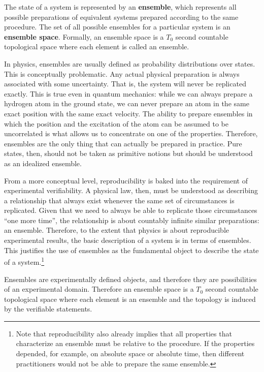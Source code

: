 \begin{mathSection}
	\begin{axiom} 
		The state of a system is represented by an \textbf{ensemble}, which represents all possible preparations of equivalent systems prepared according to the same procedure. The set of all possible ensembles for a particular system is an \textbf{ensemble space}. Formally, an ensemble space is a $T_0$ second countable topological space where each element is called an ensemble.
	\end{axiom}
	
	\begin{justification}
		In physics, ensembles are usually defined as probability distributions over states. This is conceptually problematic. Any actual physical preparation is always associated with some uncertainty. That is, the system will never be replicated exactly. This is true even in quantum mechanics: while we can always prepare a hydrogen atom in the ground state, we can never prepare an atom in the same exact position with the same exact velocity. The ability to prepare ensembles in which the position and the excitation of the atom can be assumed to be uncorrelated is what allows us to concentrate on one of the properties. Therefore, ensembles are the only thing that can actually be prepared in practice. Pure states, then, should not be taken as primitive notions but should be understood as an idealized ensemble. 
		
		From a more conceptual level, reproducibility is baked into the requirement of experimental verifiability. A physical law, then, must be understood as describing a relationship that always exist whenever the same set of circumstances is replicated. Given that we need to always be able to replicate those circumstances ``one more time'', the relationship is about countably infinite similar preparations: an ensemble. Therefore, to the extent that physics is about reproducible experimental results, the basic description of a system is in terms of ensembles. This justifies the use of ensembles as the fundamental object to describe the state of a system.\footnote{Note that reproducibility also already implies that all properties that characterize an ensemble must be relative to the procedure. If the properties depended, for example, on absolute space or absolute time, then different practitioners would not be able to prepare the same ensemble.}
		
		Ensembles are experimentally defined objects, and therefore they are possibilities of an experimental domain. Therefore an ensemble space is a $T_0$ second countable topological space where each element is an ensemble and the topology is induced by the verifiable statements.
	\end{justification}
\end{mathSection}

